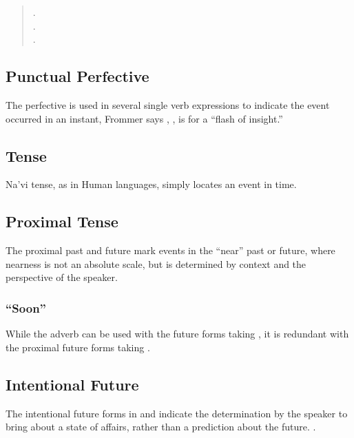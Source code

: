 \begin{quotation}
\noindent{}.\\
\indent{}.\\

\noindent{}.\\
\indent{}
\end{quotation}

\subsection{Punctual Perfective} The perfective is used in several
single verb expressions to indicate the event occurred in an instant,
   
Frommer says , , is for a ``flash of insight.''

\subsection{Tense} Na'vi tense, as in Human languages, simply locates
an event in time.


\subsection{Proximal Tense} The proximal past and future mark events
in the ``near'' past or future, where nearness is not an absolute
scale, but is determined by context and the perspective of the
speaker.

\subsubsection{``Soon''} While the adverb   can be used
with the future forms taking , it is redundant with the
proximal future forms taking .

\subsection{Intentional Future} \label{syn:verb:intenfut}
The intentional future forms in  and 
indicate the deter\-mina\-tion by the speaker to bring about a state
of affairs, rather than a prediction about the future.     .

